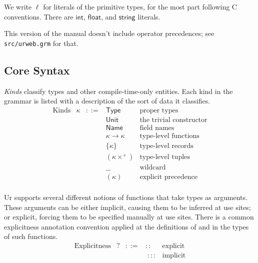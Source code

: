 \documentclass{article}
\newcommand{\mt}[1]{\mathsf{#1}}
\begin{document}
We write $\ell$ for literals of the primitive types, for the most part following C conventions.  There are $\mt{int}$, $\mt{float}$, and $\mt{string}$ literals.

This version of the manual doesn't include operator precedences; see \texttt{src/urweb.grm} for that.

\subsection{Core Syntax}

\emph{Kinds} classify types and other compile-time-only entities.  Each kind in the grammar is listed with a description of the sort of data it classifies.
$$\begin{array}{rrcll}
  \textrm{Kinds} & \kappa &::=& \mt{Type} & \textrm{proper types} \\
  &&& \mt{Unit} & \textrm{the trivial constructor} \\
  &&& \mt{Name} & \textrm{field names} \\
  &&& \kappa \to \kappa & \textrm{type-level functions} \\
  &&& \{\kappa\} & \textrm{type-level records} \\
  &&& (\kappa\times^+) & \textrm{type-level tuples} \\
  &&& \_\_ & \textrm{wildcard} \\
  &&& (\kappa) & \textrm{explicit precedence} \\
\end{array}$$

Ur supports several different notions of functions that take types as arguments.  These arguments can be either implicit, causing them to be inferred at use sites; or explicit, forcing them to be specified manually at use sites.  There is a common explicitness annotation convention applied at the definitions of and in the types of such functions.
$$\begin{array}{rrcll}
  \textrm{Explicitness} & ? &::=& :: & \textrm{explicit} \\
  &&& \; ::: & \textrm{implicit}
\end{array}$$
\end{document}
